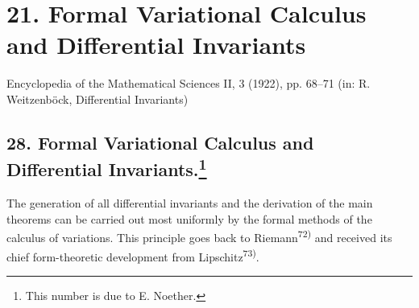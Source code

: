 \documentclass[11pt]{article}
\begin{document}
\clearpage
\section*{21. Formal Variational Calculus and Differential Invariants}
\begin{center}
Encyclopedia of the Mathematical Sciences II, 3 (1922), pp. 68--71 (in: R. Weitzenböck, Differential Invariants)
\end{center}

\setcounter{footnote}{148}
\subsection*{28. Formal Variational Calculus and Differential Invariants.\footnote{This number is due to E. Noether.}}

The generation of all differential invariants and the derivation of the main theorems can be carried out most uniformly by the formal methods of the calculus of variations. This principle goes back to Riemann\textsuperscript{72)} and received its chief form-theoretic development from Lipschitz\textsuperscript{73)}.
\end{document}
